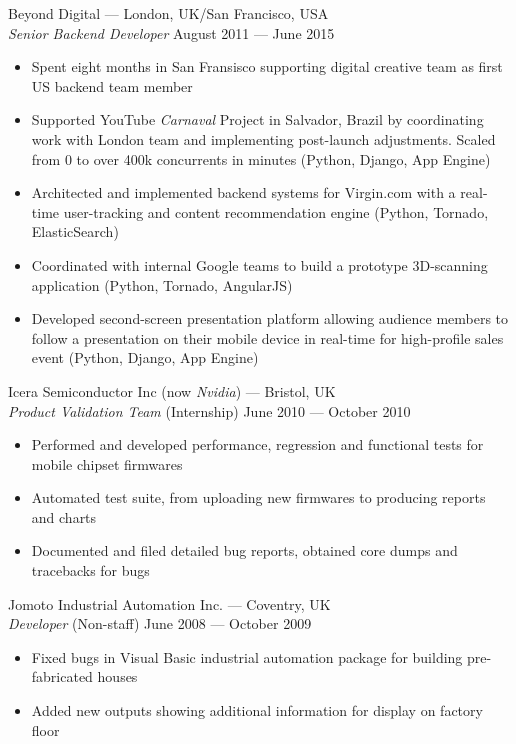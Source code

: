 \documentclass[margin, 10pt]{res}
\begin{document}
\begin{resume}
Beyond Digital --- London, UK/San Francisco, USA \\
{\sl Senior Backend Developer} \hfill August 2011 --- June 2015 \\

\begin{itemize} \itemsep -1pt
\item Spent eight months in San Fransisco supporting digital creative team as first US backend team member
\item Supported YouTube \textit{Carnaval} Project in Salvador, Brazil by coordinating work with London team and implementing post-launch adjustments. Scaled from 0 to over 400k concurrents in minutes (Python, Django, App Engine)
\item Architected and implemented backend systems for Virgin.com with a real-time user-tracking and content recommendation engine (Python, Tornado, ElasticSearch)
\item Coordinated with internal Google teams to build a prototype 3D-scanning application (Python, Tornado, AngularJS)
\item Developed second-screen presentation platform allowing audience members to follow a presentation on their mobile device in real-time for high-profile sales event (Python, Django, App Engine)
\end{itemize}

Icera Semiconductor Inc (now \textit{Nvidia}) --- Bristol, UK \\
{\sl Product Validation Team} \hfill (Internship) June 2010 --- October 2010 \\
\begin{itemize} \itemsep -1pt
\item Performed and developed performance, regression and functional tests for mobile chipset firmwares
\item Automated test suite, from uploading new firmwares to producing reports and charts
\item Documented and filed detailed bug reports, obtained core dumps and tracebacks for bugs
\end{itemize}

Jomoto Industrial Automation Inc. --- Coventry, UK \\
{\sl Developer} \hfill (Non-staff) June 2008 --- October 2009 \\
\begin{itemize} \itemsep -1pt
\item Fixed bugs in Visual Basic industrial automation package for building pre-fabricated houses
\item Added new outputs showing additional information for display on factory floor
\end{itemize}


\end{resume}
\end{document}
